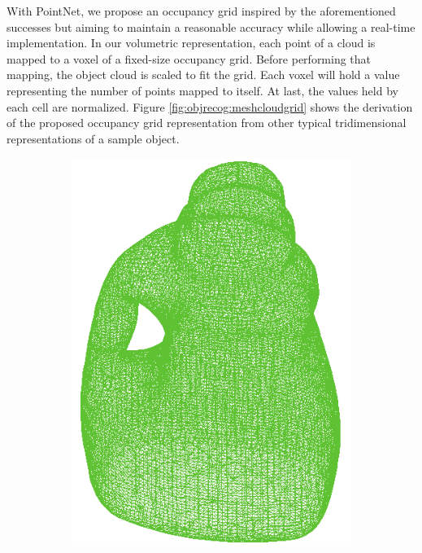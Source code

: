 
With PointNet, we propose an occupancy grid inspired by the aforementioned successes but aiming to maintain a reasonable accuracy while allowing a real-time implementation. In our volumetric representation, each point of a cloud is mapped to a voxel of a fixed-size occupancy grid. Before performing that mapping, the object cloud is scaled to fit the grid. Each voxel will hold a value representing the number of points mapped to itself. At last, the values held by each cell are normalized. Figure \ref{fig:objrecog:meshcloudgrid} shows the derivation of the proposed occupancy grid representation from other typical tridimensional representations of a sample object.

\begin{figure}
  \centering
  \begin{subfigure}{0.3\linewidth}
    \centering
    \includegraphics[width=\linewidth]{Figures/ObjRecog/mesh.png}

\end{subfigure}
\end{figure}
